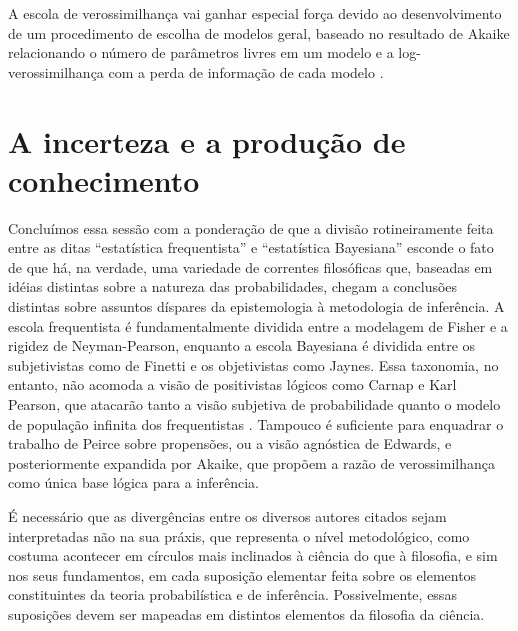 A escola de verossimilhança vai ganhar especial força devido ao desenvolvimento de um procedimento de escolha de modelos
geral, baseado no resultado de Akaike relacionando o número de parâmetros livres em um modelo e a log-verossimilhança
com a perda de informação de cada modelo \citep{Akaike74}. %
\section{A incerteza e a produção de conhecimento}

Concluímos essa sessão com a ponderação de que a divisão rotineiramente feita entre as ditas ``estatística frequentista'' e 
``estatística Bayesiana'' esconde o fato de que há, na verdade, uma variedade de correntes filosóficas que, baseadas
em idéias distintas sobre a natureza das probabilidades, chegam a
conclusões distintas sobre assuntos díspares %
da epistemologia 
à metodologia de inferência. A escola frequentista é fundamentalmente dividida entre a modelagem de Fisher e a rigidez de
Neyman-Pearson, enquanto a escola Bayesiana é dividida entre os
subjetivistas como de Finetti e os objetivistas como Jaynes.%
Essa taxonomia, no entanto, não acomoda a visão de positivistas lógicos como Carnap e Karl Pearson, que atacarão tanto
a visão subjetiva de probabilidade quanto o modelo de população infinita dos frequentistas \citep{Lenhard06, Zabell09}.
Tampouco é suficiente para enquadrar o trabalho de Peirce sobre propensões, ou a visão agnóstica de Edwards, e posteriormente
expandida por Akaike, que propõem a razão de verossimilhança como única base lógica para a inferência.

É necessário que as divergências entre os diversos autores citados sejam interpretadas não na sua práxis, que representa 
o nível metodológico, como costuma acontecer em círculos mais inclinados à ciência do que à filosofia, 
e sim nos seus fundamentos, em cada suposição elementar feita sobre os
elementos constituintes da teoria probabilística e de inferência. Possivelmente, essas suposições devem ser mapeadas em
distintos elementos da filosofia da ciência.

